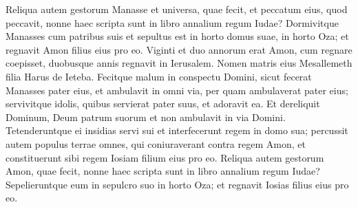 \begin{biblechapter}
\begin{biblechapter}
\begin{biblechapter}
\begin{biblechapter}
\begin{biblechapter}
\begin{biblechapter}
\begin{biblechapter}
\begin{biblechapter}
\begin{biblechapter}
\begin{biblechapter}
\begin{biblechapter}
\begin{biblechapter}
\begin{biblechapter}
\begin{biblechapter}
\begin{biblechapter}
\begin{biblechapter}
\begin{biblechapter}
\begin{biblechapter}
\begin{biblechapter}
\begin{biblechapter}
\begin{biblechapter}
 \verse Reliqua autem gestorum Manasse et universa, quae fecit, et peccatum eius, quod peccavit, nonne haec scripta sunt in libro annalium regum Iudae? 
\verse Dormivitque Manasses cum patribus suis et sepultus est in horto domus suae, in horto Oza; et regnavit Amon filius eius pro eo. 
\verse Viginti et duo annorum erat Amon, cum regnare coepisset, duobusque annis regnavit in Ierusalem. Nomen matris eius Mesallemeth filia Harus de Ieteba. 
\verse Fecitque malum in conspectu Domini, sicut fecerat Manasses pater eius, 
\verse et ambulavit in omni via, per quam ambulaverat pater eius; servivitque idolis, quibus servierat pater suus, et adoravit ea. 
\verse Et dereliquit Dominum, Deum patrum suorum et non ambulavit in via Domini.
 \verse Tetenderuntque ei insidias servi sui et interfecerunt regem in domo sua; 
 \verse percussit autem populus terrae omnes, qui coniuraverant contra regem Amon, et constituerunt sibi regem Iosiam filium eius pro eo.
 \verse Reliqua autem gestorum Amon, quae fecit, nonne haec scripta sunt in libro annalium regum Iudae? 
\verse Sepelieruntque eum in sepulcro suo in horto Oza; et regnavit Iosias filius eius pro eo.
 

\end{biblechapter}
\end{biblechapter}
\end{biblechapter}
\end{biblechapter}
\end{biblechapter}
\end{biblechapter}
\end{biblechapter}
\end{biblechapter}
\end{biblechapter}
\end{biblechapter}
\end{biblechapter}
\end{biblechapter}
\end{biblechapter}
\end{biblechapter}
\end{biblechapter}
\end{biblechapter}
\end{biblechapter}
\end{biblechapter}
\end{biblechapter}
\end{biblechapter}
\end{biblechapter}
